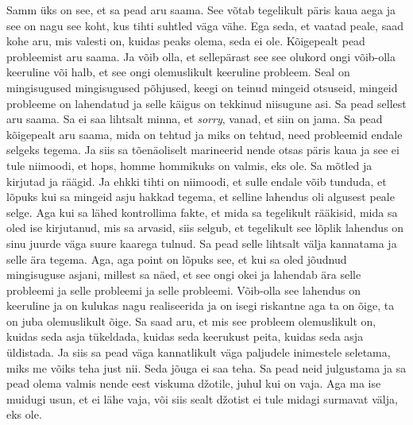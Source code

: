 Samm üks on see, et sa pead aru saama. See võtab tegelikult päris kaua aega ja 
see on nagu see koht, kus tihti suhtled väga vähe. Ega seda, et vaatad peale, 
saad kohe aru,  mis valesti on, kuidas peaks olema, seda ei ole. Kõigepealt 
pead probleemist aru saama. Ja võib olla, et  sellepärast see see olukord ongi 
võib-olla keeruline või halb,  et see ongi olemuslikult keeruline probleem. 
Seal on mingisugused mingisugused põhjused, keegi on teinud mingeid otsuseid, 
mingeid probleeme on lahendatud ja selle käigus on tekkinud niisugune asi. Sa 
pead sellest aru saama. Sa ei saa lihtsalt minna, et \emph{sorry}, vanad, et 
siin on jama. Sa pead kõigepealt aru saama, mida on tehtud ja miks on tehtud, 
need probleemid endale selgeks tegema. Ja siis sa tõenäoliselt marineerid nende 
otsas päris kaua ja see ei tule niimoodi, et hops, homme hommikuks on valmis, 
eks ole. Sa mõtled ja kirjutad ja räägid. Ja ehkki tihti on niimoodi, et  sulle 
endale võib tunduda, et lõpuks kui sa mingeid asju hakkad tegema, et selline 
lahendus oli algusest peale selge. Aga kui sa lähed kontrollima fakte, et mida 
sa tegelikult rääkisid, mida sa oled ise kirjutanud, mis sa arvasid, siis 
selgub, et tegelikult see lõplik lahendus on sinu juurde väga suure kaarega 
tulnud. Sa pead selle lihtsalt välja kannatama ja selle ära tegema. Aga, aga 
point on lõpuks see, et kui sa oled jõudnud mingisuguse asjani, millest sa 
näed, et see ongi okei ja lahendab ära  selle probleemi ja selle probleemi ja 
selle probleemi. Võib-olla see lahendus on keeruline ja on kulukas nagu 
realiseerida ja on isegi riskantne aga ta on õige, ta on juba olemuslikult 
õige. Sa saad aru, et mis see probleem olemuslikult on, kuidas seda asja  
tükeldada, kuidas seda keerukust peita, kuidas seda asja üldistada. Ja siis sa 
pead väga kannatlikult väga paljudele inimestele seletama, miks me võiks teha 
just nii. Seda jõuga ei saa teha. Sa pead neid julgustama ja sa pead olema 
valmis nende eest viskuma džotile, juhul kui on vaja. Aga ma ise muidugi usun, 
et ei lähe vaja, või siis sealt džotist ei tule midagi surmavat välja, eks ole.
